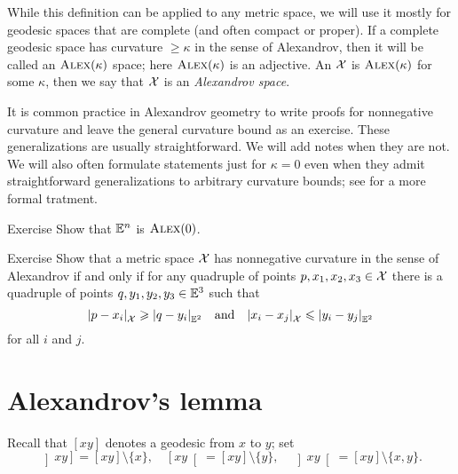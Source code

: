 While this definition can be applied to any metric space,
we will use it mostly for geodesic spaces that are complete (and often compact or proper). 
If a complete geodesic space has curvature $\ge\kappa$ in the sense of Alexandrov, 
then it will be called an $\textsc{Alex}(\kappa)$ space; here $\textsc{Alex}(\kappa)$ is an adjective.
An $\mathcal{X}$ is $\textsc{Alex}(\kappa)$ for some $\kappa$, then we say that $\mathcal{X}$ is an \emph{Alexandrov space}.

It is common practice in Alexandrov geometry to write proofs for nonnegative curvature and 
leave the general curvature bound as an exercise. These generalizations are usually straightforward. We will add notes when they are not.
We will also often formulate statements just for $\kappa=0$ even when they admit straightforward generalizations to arbitrary curvature bounds;
see \cite{alexander-kapovitch-petrunin2024} for a more formal tratment.


\begin{thm}{Exercise}\label{ex:Euclid-is-CBB}
Show that $\mathbb{E}^n$ is $\textsc{Alex}(0)$.
\end{thm}

\begin{thm}{Exercise}\label{ex:(3+1)-expanding}
Show that a metric space $\mathcal{X}$ has nonnegative curvature in the sense of Alexandrov
if and only if for any quadruple of points $p,x_1,x_2,x_3\in \mathcal{X}$ 
there is a quadruple of points $q,y_1,y_2,y_3\in\mathbb{E}^3$
such that 
\[|{p}-{x_i}|_{\mathcal{X}}^{{}}\geqslant|{q}-{y_i}|_{\mathbb{E}^2}^{{}} 
\quad \text{and}\quad
|{x_i}-{x_j}|_{\mathcal{X}}^{{}}\leqslant|{y_i}-{y_j}|_{\mathbb{E}^2}^{{}}\] 
for all $i$ and $j$.
\end{thm}

\section{Alexandrov's lemma}

Recall that $[xy]$ denotes a geodesic from $x$ to $y$;
set  
\index{10@$\left]x y\right]$, $\left[x y\right[$, $\left]x y\right[$}
\[
\left]x y\right]=[xy]\setminus\{x\},
\quad
\left[x y\right[=[xy]\setminus\{y\},
\quad
\left]x y\right[=[xy]\setminus\{x,y\}.\]

